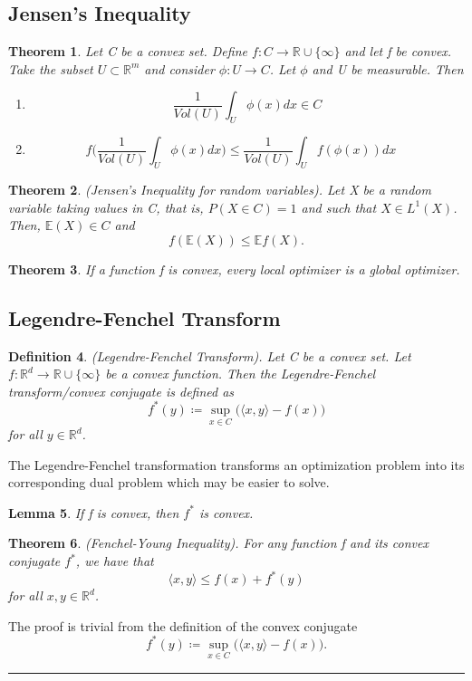 \documentclass[twoside]{article}
\newcounter{lecnum}
\newtheorem{theorem}{Theorem}[lecnum]
\newtheorem{lemma}[theorem]{Lemma}
\newtheorem{definition}[theorem]{Definition}
\newenvironment{proof}{{\bf Proof:}}{\hfill\rule{2mm}{2mm}}
\begin{document}
\subsection{Jensen's Inequality}
\begin{theorem} Let C be a convex set. Define $f: C \rightarrow \mathbb{R} \cup \{\infty\}$ and let f be convex. Take the subset $U \subset \mathbb{R}^m$  and consider $\phi: U \rightarrow C$. Let $\phi$ and U be measurable. Then
\begin{enumerate}
\item $$\frac{1}{Vol(U)}\int_U \phi(x)dx \in C$$
\item $$f\big(\frac{1}{Vol(U)}\int_U\phi(x)dx\big) \leq \frac{1}{Vol(U)}\int_Uf(\phi(x))dx \quad$$ 
\end{enumerate}
\end{theorem}

\begin{theorem}(Jensen's Inequality for random variables). Let X be a random variable taking values in C, that is, $P(X \in C) = 1$ and such that $X \in L^1(X)$. Then, $\mathbb{E}(X) \in C$ and 
$$
f(\mathbb{E}(X)) \leq \mathbb{E}f(X).
$$
\end{theorem}

\begin{theorem}If a function f is convex, every local optimizer is a global optimizer.
\end{theorem}

\subsection{Legendre-Fenchel Transform}

\begin{definition}(Legendre-Fenchel Transform). Let C be a convex set. Let $f: \mathbb{R}^d \rightarrow \mathbb{R} \cup \{\infty\}$ be a convex function. Then the Legendre-Fenchel transform/convex conjugate is defined as
$$
f^*(y) \coloneqq \sup_{x \in C}\big(\langle x, y \rangle - f(x)\big)
$$
for all $y \in \mathbb{R}^d$.
\end{definition}

The Legendre-Fenchel transformation transforms an optimization problem into its corresponding dual problem which may be easier to solve.

\begin{lemma}If f is convex, then $f^*$ is convex.
\end{lemma}

\begin{theorem}(Fenchel-Young Inequality). For any function f and its convex conjugate $f^*$, we have that
$$
\langle x, y \rangle \leq f(x) + f^*(y)
$$
for all $x, y \in \mathbb{R}^d$.
\end{theorem}
\begin{proof} The proof is trivial from the definition of the convex conjugate
$$
f^*(y) \coloneqq \sup_{x \in C}\big(\langle x, y \rangle - f(x)\big).
$$
\end{proof}
\end{document}
